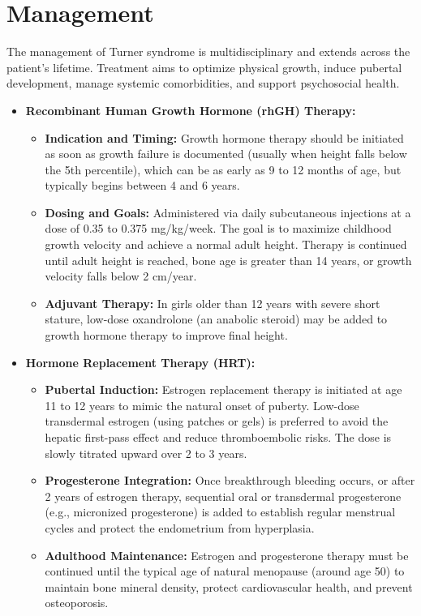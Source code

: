 \section*{Management}
The management of Turner syndrome is multidisciplinary and extends across the patient's lifetime. Treatment aims to optimize physical growth, induce pubertal development, manage systemic comorbidities, and support psychosocial health.
\begin{itemize}
    \item \textbf{Recombinant Human Growth Hormone (rhGH) Therapy:}
    \begin{itemize}
        \item \textbf{Indication and Timing:} Growth hormone therapy should be initiated as soon as growth failure is documented (usually when height falls below the 5th percentile), which can be as early as 9 to 12 months of age, but typically begins between 4 and 6 years.
        \item \textbf{Dosing and Goals:} Administered via daily subcutaneous injections at a dose of 0.35 to 0.375 mg/kg/week. The goal is to maximize childhood growth velocity and achieve a normal adult height. Therapy is continued until adult height is reached, bone age is greater than 14 years, or growth velocity falls below 2 cm/year.
        \item \textbf{Adjuvant Therapy:} In girls older than 12 years with severe short stature, low-dose oxandrolone (an anabolic steroid) may be added to growth hormone therapy to improve final height.
    \end{itemize}
    \item \textbf{Hormone Replacement Therapy (HRT):}
    \begin{itemize}
        \item \textbf{Pubertal Induction:} Estrogen replacement therapy is initiated at age 11 to 12 years to mimic the natural onset of puberty. Low-dose transdermal estrogen (using patches or gels) is preferred to avoid the hepatic first-pass effect and reduce thromboembolic risks. The dose is slowly titrated upward over 2 to 3 years.
        \item \textbf{Progesterone Integration:} Once breakthrough bleeding occurs, or after 2 years of estrogen therapy, sequential oral or transdermal progesterone (e.g., micronized progesterone) is added to establish regular menstrual cycles and protect the endometrium from hyperplasia.
        \item \textbf{Adulthood Maintenance:} Estrogen and progesterone therapy must be continued until the typical age of natural menopause (around age 50) to maintain bone mineral density, protect cardiovascular health, and prevent osteoporosis.

\end{itemize}
\end{itemize}
